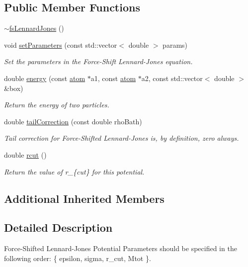 \subsection*{Public Member Functions}
\begin{DoxyCompactItemize}
\item 
\hyperlink{classfs_lennard_jones_a3ac9865901b9b36e4ef1dafdd2f059ad}{$\sim$fs\-Lennard\-Jones} ()
\item 
void \hyperlink{classfs_lennard_jones_a374bec4ba1510893ef2765251b978c47}{set\-Parameters} (const std\-::vector$<$ double $>$ params)
\begin{DoxyCompactList}\small\item\em Set the parameters in the Force-\/\-Shift Lennard-\/\-Jones equation. \end{DoxyCompactList}\item 
double \hyperlink{classfs_lennard_jones_a2f45293eeb451446a45349abd23342e1}{energy} (const \hyperlink{classatom}{atom} $\ast$a1, const \hyperlink{classatom}{atom} $\ast$a2, const std\-::vector$<$ double $>$ \&box)
\begin{DoxyCompactList}\small\item\em Return the energy of two particles. \end{DoxyCompactList}\item 
double \hyperlink{classfs_lennard_jones_a342461a06106980e3e476956b83950bc}{tail\-Correction} (const double rho\-Bath)
\begin{DoxyCompactList}\small\item\em Tail correction for Force-\/\-Shifted Lennard-\/\-Jones is, by definition, zero always. \end{DoxyCompactList}\item 
double \hyperlink{classfs_lennard_jones_aaee77a863f5e681c43fdc67fecf10345}{rcut} ()
\begin{DoxyCompactList}\small\item\em Return the value of r\-\_\-\{cut\} for this potential. \end{DoxyCompactList}\end{DoxyCompactItemize}
\subsection*{Additional Inherited Members}


\subsection{Detailed Description}
Force-\/\-Shifted Lennard-\/\-Jones Potential Parameters should be specified in the following order\-: \{ epsilon, sigma, r\-\_\-cut, Mtot \}. 

